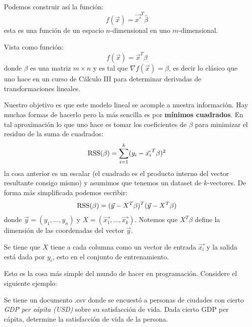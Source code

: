 \documentclass[12pt]{report}
\newcounter{it}
\theoremstyle{largebreak}
\begin{document}
    Podemos construir así la función:
    \begin{equation}
        f(\vec{x})=\vec{x'}^T\hat{\beta}
    \end{equation}
    esta es una función de un espacio $n$-dimensional en uno $m$-dimensional.

    Vista como función:
    \begin{equation}
        f(\vec{x})=\vec{x}^T\beta
    \end{equation}
    donde $\beta$ es una matriz $m\times n$ y es tal que $\nabla f(\vec{x})=\beta$, es decir lo clásico que uno hace en un curso de Cálculo III para determinar derivadas de transformaciones lineales.

    Nuestro objetivo es que este modelo lineal se acomple a nuestra información. Hay muchas formas de hacerlo pero la más sencilla es por \textbf{mínimos cuadrados}. En tal aproximación lo que uno hace es tomar los coeficientes de $\beta$ para minimizar el residuo de la suma de cuadrados:
    \begin{equation}
        \textup{RSS}(\beta)=\sum_{i=1}^k(y_i-\vec{x_i}^T\beta)^2
    \end{equation}
    la cosa anterior es un escalar (el cuadrado es el producto interno del vector resultante consigo mismo) y asumimos que tenemos un dataset de $k$-vectores. De forma más simplificada podemos escribir:
    \begin{equation}
        \textup{RSS}(\beta)=(\vec{y}-X^T\beta)^T(\vec{y}-X^T\beta)
    \end{equation}
    donde $\vec{y}=(y_1,...,y_n)$ y $X=(\vec{x_1},...,\vec{x_k})$. Notemos que $X^T\beta$ define la dimensión de las coordenadas del vector $\vec{y}$.

    Se tiene que $X$ tiene a cada columna como un vector de entrada $\vec{x_i}$ y la salida está dada por $y_i$, esto en el conjunto de entrenamiento.

    Esto es la cosa más simple del mundo de hacer en programación. Considere el siguiente ejemplo:

    \begin{exa}
        Se tiene un documento .csv donde se encuestó a personas de ciudades con cierto \textit{GDP per cápita (USD)} sobre su satisfacción de vida. Dada cierto GDP per cápita, determine la satisfacción de vida de la persona.
    \end{exa}
\end{document}
